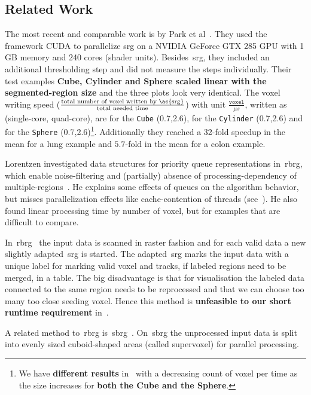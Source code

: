 \documentclass{article}
\begin{document}
\subsection{Related Work}\label{subsec:relatedwork}
The most recent and comparable work is by Park et al~\cite{2014park}.
They used the framework CUDA to parallelize \acl{srg} on a NVIDIA GeForce GTX 285 GPU with 1 GB memory and 240 cores (shader units).
Besides~\ac{srg}, they included an additional thresholding step and did not measure the steps individually.
Their test examples \textbf{Cube, Cylinder and Sphere scaled linear with the segmented-region size} and the three plots look very identical.
The voxel writing speed ($\frac{\text{total number of voxel written by~\ac{srg}}}{\text{total needed time}}$) with unit $\frac{\texttt{voxel}}{\mu s}$, written as (single-core, quad-core), are for the \texttt{Cube} (0.7,2.6), for the \texttt{Cylinder} (0.7,2.6) and for the \texttt{Sphere} (0.7,2.6)\footnote{We have \textbf{different results} in~ with a decreasing count of voxel per time as the size increases for \textbf{both the Cube and the Sphere}.}.
Additionally they reached a 32-fold speedup in the mean for a lung example and $5.7$-fold in the mean for a colon example.\par
Lorentzen investigated data structures for priority queue representations in~\ac{rbrg}, which enable noise-filtering and (partially) absence of processing-dependency of multiple-regions~\cite{2011lorentzen}.
He explains some effects of queues on the algorithm behavior, but misses parallelization effects like cache-contention of threads (see~).
He also found linear processing time by number of voxel, but for examples that are difficult to compare.\par
In~\ac{rbrg}~\cite{bailey1991} the input data is scanned in raster fashion and for each valid data a new slightly adapted~\ac{srg} is started.
The adapted~\ac{srg} marks the input data with a unique label for marking valid voxel and tracks, if labeled regions need to be merged, in a table.
The big disadvantage is that for visualisation the labeled data connected to the same region needs to be reprocessed and that we can choose too many too close seeding voxel.
Hence this method is \textbf{unfeasible to our short runtime requirement} in~.\par
A related method to~\ac{rbrg} is~\ac{sbrg}~\cite{dong2020}.
On~\ac{sbrg} the unprocessed input data is split into evenly sized cuboid-shaped areas (called supervoxel) for parallel processing.
\end{document}
